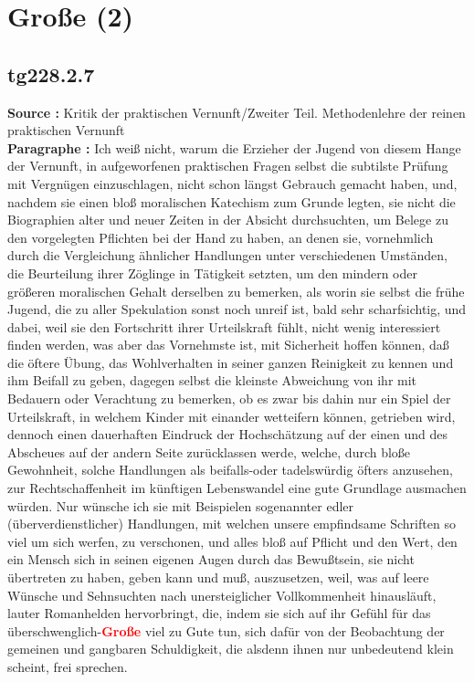 \documentclass[a4paper,12pt,twoside]{book}
\newcommand{\match}[1]{\textcolor{red}{\textbf{#1}}}
\newcommand{\unnumberedsection}[1]{
	\section*{#1}
	\addcontentsline{toc}{section}{#1}
	\markright{#1}
}
\begin{document}
	\unnumberedsection{Große (2)} 
	\subsection*{tg228.2.7} 
	\textbf{Source : }Kritik der praktischen Vernunft/Zweiter Teil. Methodenlehre der reinen praktischen Vernunft\\  
	
	\noindent\textbf{Paragraphe : }Ich weiß nicht, warum die Erzieher der Jugend von diesem Hange der Vernunft, in aufgeworfenen praktischen Fragen selbst die subtilste Prüfung mit Vergnügen einzuschlagen, nicht schon längst Gebrauch gemacht haben, und, nachdem sie einen bloß moralischen Katechism zum Grunde legten, sie nicht die Biographien alter und neuer Zeiten in  der Absicht durchsuchten, um Belege zu den vorgelegten Pflichten bei der Hand zu haben, an denen sie, vornehmlich durch die Vergleichung ähnlicher Handlungen unter verschiedenen Umständen, die Beurteilung ihrer Zöglinge in Tätigkeit setzten, um den mindern oder größeren moralischen Gehalt derselben zu bemerken, als worin sie selbst die frühe Jugend, die zu aller Spekulation sonst noch unreif ist, bald sehr scharfsichtig, und dabei, weil sie den Fortschritt ihrer Urteilskraft fühlt, nicht wenig interessiert finden werden, was aber das Vornehmste ist, mit Sicherheit hoffen können, daß die öftere Übung, das Wohlverhalten in seiner ganzen Reinigkeit zu kennen und ihm Beifall zu geben, dagegen selbst die kleinste Abweichung von ihr mit Bedauern oder Verachtung zu bemerken, ob es zwar bis dahin nur ein Spiel der Urteilskraft, in welchem Kinder mit einander wetteifern können, getrieben wird, dennoch einen dauerhaften Eindruck der Hochschätzung auf der einen und des Abscheues auf der andern Seite zurücklassen werde, welche, durch bloße Gewohnheit, solche Handlungen als beifalls-oder tadelswürdig öfters anzusehen, zur Rechtschaffenheit im künftigen Lebenswandel eine gute Grundlage ausmachen würden. Nur wünsche ich sie mit Beispielen sogenannter edler (überverdienstlicher) Handlungen, mit welchen unsere empfindsame Schriften so viel um sich werfen, zu verschonen, und alles bloß auf Pflicht und den Wert, den ein Mensch sich in seinen eigenen Augen durch das Bewußtsein, sie nicht übertreten zu haben, geben kann und muß, auszusetzen, weil, was auf leere Wünsche und Sehnsuchten nach unersteiglicher Vollkommenheit hinausläuft, lauter Romanhelden hervorbringt, die, indem sie sich auf ihr Gefühl für das überschwenglich-\match{Große} viel zu Gute tun, sich dafür von der Beobachtung der gemeinen und gangbaren Schuldigkeit, die alsdenn ihnen nur unbedeutend klein scheint, frei sprechen.
	
\end{document}
